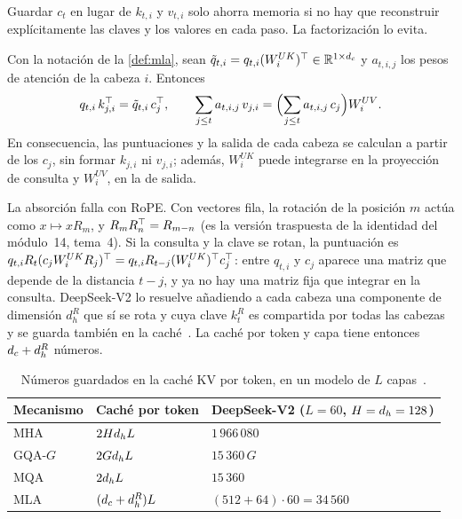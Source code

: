 Guardar $c_t$ en lugar de $k_{t,i}$ y $v_{t,i}$ solo ahorra memoria si no hay que reconstruir explícitamente las claves y los valores en cada paso. La factorización lo evita.

\begin{proposicion}\label{prop:absorcion}
Con la notación de la \cref{def:mla}, sean $\tilde q_{t,i}=q_{t,i}(W^{UK}_i)^{\top}\in\mathbb{R}^{1\times d_{c}}$ y $a_{t,i,j}$ los pesos de atención de la cabeza $i$. Entonces
\[
q_{t,i}\,k_{j,i}^{\top}=\tilde q_{t,i}\,c_j^{\top},\qquad \sum_{j\le t}a_{t,i,j}\,v_{j,i}=\Bigl(\sum_{j\le t}a_{t,i,j}\,c_j\Bigr)W^{UV}_i .
\]
En consecuencia, las puntuaciones y la salida de cada cabeza se calculan a partir de los $c_j$, sin formar $k_{j,i}$ ni $v_{j,i}$; además, $W^{UK}_i$ puede integrarse en la proyección de consulta y $W^{UV}_i$, en la de salida.
\end{proposicion}

\begin{observacion}
La absorción falla con RoPE. Con vectores fila, la rotación de la posición $m$ actúa como $x\mapsto xR_m$, y $R_mR_n^{\top}=R_{m-n}$ (es la versión traspuesta de la identidad del módulo~14, tema~4). Si la consulta y la clave se rotan, la puntuación es $q_{t,i}R_t(c_jW^{UK}_iR_j)^{\top}=q_{t,i}R_{t-j}(W^{UK}_i)^{\top} c_j^{\top}$: entre $q_{t,i}$ y $c_j$ aparece una matriz que depende de la distancia $t-j$, y ya no hay una matriz fija que integrar en la consulta. DeepSeek-V2 lo resuelve añadiendo a cada cabeza una componente de dimensión $d_h^{R}$ que sí se rota y cuya clave $k^{R}_t$ es compartida por todas las cabezas y se guarda también en la caché~\cite[§2.1.3]{deepseekv2}. La caché por token y capa tiene entonces $d_{c}+d_h^{R}$ números.
\end{observacion}

\begin{table}[ht]
\centering\small
\caption{Números guardados en la caché KV por token, en un modelo de $L$ capas~\cite[tabla~1]{deepseekv2}.}\label{tab:mla}
\begin{tabular}{@{}lll@{}}
\toprule
Mecanismo & Caché por token & DeepSeek-V2 ($L=60$, $H=d_{h}=128$) \\
\midrule
MHA & $2Hd_{h} L$ & $1\,966\,080$ \\
GQA-$G$ & $2Gd_{h} L$ & $15\,360\,G$ \\
MQA & $2d_{h} L$ & $15\,360$ \\
MLA & $(d_{c}+d_h^{R})L$ & $(512+64)\cdot 60=34\,560$ \\
\bottomrule
\end{tabular}
\end{table}

\addtocounter{definicion}{1}%

